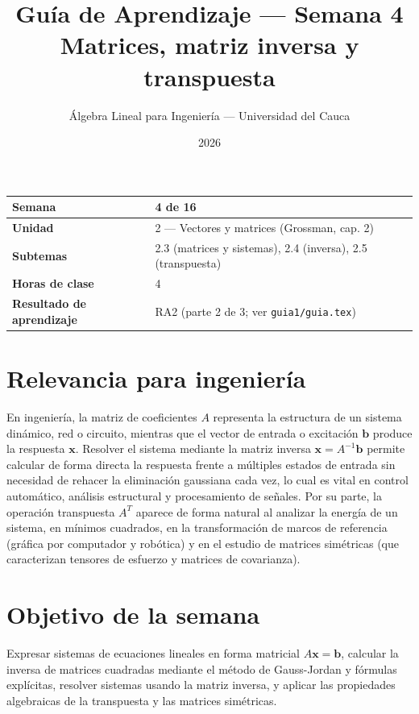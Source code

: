 \documentclass[11pt,letterpaper]{article}
\title{\textcolor{unicaucaverde}{\Large Guía de Aprendizaje — Semana 4}\\[4pt]
  \large Matrices, matriz inversa y transpuesta}
\author{Álgebra Lineal para Ingeniería --- Universidad del Cauca}
\date{2026}
\newcommand{\vv}[1]{\mathbf{#1}}
\begin{document}
\maketitle

\begin{center}
\begin{tabular}{|>{\bfseries}p{4cm}|p{10cm}|}
\hline
Semana & 4 de 16 \\ \hline
Unidad & 2 --- Vectores y matrices (Grossman, cap. 2) \\ \hline
Subtemas & 2.3 (matrices y sistemas), 2.4 (inversa), 2.5 (transpuesta) \\
\hline
Horas de clase & 4 \\ \hline
Resultado de aprendizaje & RA2 (parte 2 de 3; ver \texttt{guia1/guia.tex}) \\ \hline
\end{tabular}
\end{center}

\section*{Relevancia para ingeniería}

En ingeniería, la matriz de coeficientes $A$ representa la estructura de un sistema dinámico, red
o circuito, mientras que el vector de entrada o excitación $\vv{b}$ produce la respuesta $\vv{x}$.
Resolver el sistema mediante la matriz inversa $\vv{x}=A^{-1}\vv{b}$ permite calcular de forma directa
la respuesta frente a múltiples estados de entrada sin necesidad de rehacer la eliminación gaussiana
cada vez, lo cual es vital en control automático, análisis estructural y procesamiento de señales.
Por su parte, la operación transpuesta $A^T$ aparece de forma natural al analizar la energía de un
sistema, en mínimos cuadrados, en la transformación de marcos de referencia (gráfica por computador y
robótica) y en el estudio de matrices simétricas (que caracterizan tensores de esfuerzo y matrices de
covarianza).

\section{Objetivo de la semana}

Expresar sistemas de ecuaciones lineales en forma matricial $A\vv{x}=\vv{b}$, calcular la inversa de
matrices cuadradas mediante el método de Gauss-Jordan y fórmulas explícitas, resolver sistemas usando
la matriz inversa, y aplicar las propiedades algebraicas de la transpuesta y las matrices simétricas.
\end{document}
